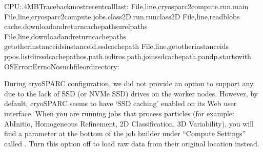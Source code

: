 \documentclass[a4paper,10pt,english]{sphinxmanual}
\begin{document}
\begin{sphinxVerbatim}[commandchars=\\\{\}]
\PYG{o}{[}CPU:.4MB\PYG{o}{]}Tracebackmostrecentcalllast:
File,line,cryosparc2\PYGZus{}compute.run.main
File,line,cryosparc2\PYGZus{}compute.jobs.class2D.run.run\PYGZus{}class\PYGZus{}2D
File,line,read\PYGZus{}blobs
cache.download\PYGZus{}and\PYGZus{}return\PYGZus{}cache\PYGZus{}pathsu\PYGZus{}rel\PYGZus{}paths
File,line,download\PYGZus{}and\PYGZus{}return\PYGZus{}cache\PYGZus{}paths
get\PYGZus{}other\PYGZus{}instance\PYGZus{}idsinstance\PYGZus{}id,ssd\PYGZus{}cache\PYGZus{}path
File,line,get\PYGZus{}other\PYGZus{}instance\PYGZus{}ids
\PYG{o}{[}ppos.listdirssd\PYGZus{}cache\PYGZus{}pathos.path.isdiros.path.joinssd\PYGZus{}cache\PYGZus{}path,pandp.startswith\PYG{o}{]}
OSError:\PYG{o}{[}Errno\PYG{o}{]}Nosuchfileordirectory:
\end{sphinxVerbatim}

\sphinxAtStartPar
During cryoSPARC configuration, we did not provide an option to support any  due to the lack of SSD (or NVMe SSD) drives on the worker nodes.
However, by default, cryoSPARC seems to have ‘SSD caching’ enabled on its Web user interface. When you are running jobs that process particles (for example: Ab\sphinxhyphen{}Initio, Homogeneous Refinement, 2D Classification, 3D Variability),
you will find a parameter at the bottom of the job builder under “Compute Settings” called .
Turn this option off to load raw data from their original location instead.
\end{document}

